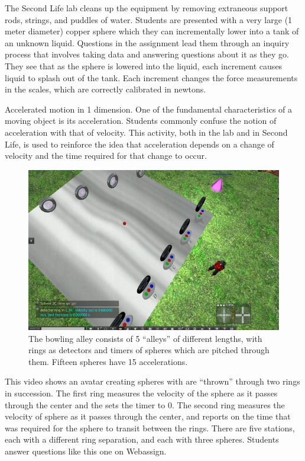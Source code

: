 \documentclass[11.5pt]{sig-alternate} %
\begin{document}
\begin{large}
The Second Life lab cleans up the equipment by removing extraneous support rods, strings, and puddles of water. Students are presented with a very large (1 meter diameter) copper sphere which they can incrementally lower into a tank of an unknown liquid. Questions in the assignment lead them through an inquiry process that involves taking data and answering questions about it as they go. They see that as the sphere is lowered into the liquid, each increment causes liquid to splash out of the tank. Each increment changes the force measurements in the scales, which are correctly calibrated in newtons.

Accelerated motion in 1 dimension. One of the fundamental characteristics of a moving object is its acceleration. Students commonly confuse the notion of acceleration with that of velocity. This activity, both in the lab and in Second Life, is used to reinforce the idea that acceleration depends on a change of velocity and the time required for that change to occur.

\begin{figure}[h]
    \centering
    \includegraphics[width=1\linewidth]{fig 4.jpg}
    \caption{The bowling alley consists of 5 “alleys” of different lengths, with rings as detectors and timers of spheres which are pitched through them. Fifteen spheres have 15 accelerations.}
\end{figure}

This video shows an avatar creating spheres with are “thrown” through two rings in succession. The first ring measures the velocity of the sphere as it passes through the center and the sets the timer to 0. The second ring measures the velocity of sphere as it passes through the center, and reports on the time that was required for the sphere to transit between the rings. There are five stations, each with a different ring separation, and each with three spheres. Students answer questions like this one on Webassign.


\end{large}
\end{document}
